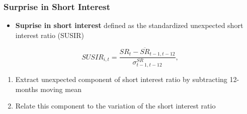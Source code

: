\documentclass{beamer}
\begin{document}
\begin{frame}
		\frametitle{Surprise in Short Interest}
\begin{itemize}
\item \textbf{Suprise in short interest} defined as the standardized unexpected short interest ratio (SUSIR)
\end{itemize}	
\begin{equation} \nonumber
SUSIR_{i,t} = \frac{SR_{t} - \overline{SR}_{t-1,t-12}}{\sigma^{SR}_{t-1,t-12}},
\label{eq:susir}
\end{equation} 
\begin{enumerate}
	\item Extract unexpected component of short interest ratio by subtracting 12-months moving mean
	\item Relate this component to the variation of the short interest ratio
\end{enumerate}

\end{frame}
\end{document}
